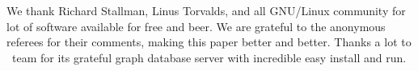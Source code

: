 
We thank Richard Stallman, Linus Torvalds, and all GNU/Linux community for lot
of software available for free and beer. We are grateful to the anonymous
referees for their comments, making this paper better and better. Thanks a lot
to \neo\ team for its grateful graph database server with incredible easy
install and run.
